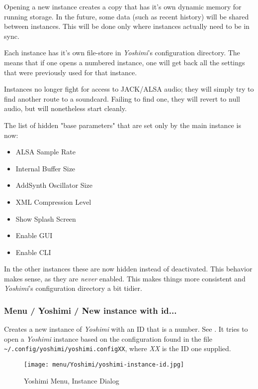    Opening a new instance creates a copy that has it's own dynamic memory for
   running storage. In the future, some data (such as recent history) will be
   shared between instances. This will be done only where instances actually
   need to be in sync.

   Each instance has it's own file-store in \textsl{Yoshimi}'s configuration
   directory. The means that if one opens a numbered instance, one will get
   back all the settings that were previously used for that instance.

   Instances no longer fight for access to JACK/ALSA audio; they will simply
   try to find another route to a soundcard. Failing to find one,
   they will revert to null audio, but will nonetheless start cleanly.

   The list of hidden "base parameters" that are set only by the main instance is
   now:

   \begin{itemize}
      \item ALSA Sample Rate
      \item Internal Buffer Size
      \item AddSynth Oscillator Size
      \item XML Compression Level
      \item Show Splash Screen
      \item Enable GUI
      \item Enable CLI
   \end{itemize}

   In the other instances these are now hidden instead of deactivated.  This
   behavior makes sense, as they are \textsl{never} enabled. This makes things
   more consistent and \textsl{Yoshimi}'s configuration directory a bit tidier.

\subsubsection{Menu / Yoshimi / New instance with id...}
\label{subsubsec:menu_yoshimi_new_instance_with_id}

   Creates a new instance of \textsl{Yoshimi}
   with an ID that is a number.
   See .
   It tries to open a \textsl{Yoshimi} instance based on the configuration
   found in the file
   \texttt{\textasciitilde/.config/\-yoshimi/\-yoshimi.configXX}, where
   \textsl{XX} is the ID one supplied.

\begin{figure}[H]
   \centering 
   \texttt{[image: menu/Yoshimi/yoshimi-instance-id.jpg]}
   \caption{Yoshimi Menu, Instance Dialog}
   \label{fig:yoshimi_instance_dialog}
\end{figure}

